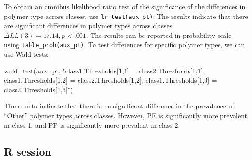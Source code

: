 \documentclass[
  man,floatsintext]{apa6}
\newenvironment{Shaded}{\begin{snugshade}}{\end{snugshade}}
\newcommand{\FunctionTok}[1]{\textcolor[rgb]{0.00,0.00,0.00}{#1}}
\newcommand{\NormalTok}[1]{#1}
\newcommand{\StringTok}[1]{\textcolor[rgb]{0.31,0.60,0.02}{#1}}
\begin{document}
To obtain an omnibus likelihood ratio test of the significance of the differences in polymer type across classes, use \texttt{lr\_test(aux\_pt)}.
The results indicate that there are significant differences in polymer types across classes, \(\Delta LL(3) = 17.14, p < .001\).
The results can be reported in probability scale using \texttt{table\_prob(aux\_pt)}.
To test differences for specific polymer types, we can use Wald tests:

\begin{Shaded}
\begin{Highlighting}[]
\FunctionTok{wald\_test}\NormalTok{(aux\_pt, }\StringTok{"class1.Thresholds[1,1] = class2.Thresholds[1,1];}
\StringTok{          class1.Thresholds[1,2] = class2.Thresholds[1,2];}
\StringTok{          class1.Thresholds[1,3] = class2.Thresholds[1,3]"}\NormalTok{)}
\end{Highlighting}
\end{Shaded}

The results indicate that there is no significant difference in the prevalence of ``Other'' polymer types across classes.
However, PE is significantly more prevalent in class 1, and PP is significantly more prevalent in class 2.

\hypertarget{r-session}{%
\subsection{R session}\label{r-session}}
\end{document}
